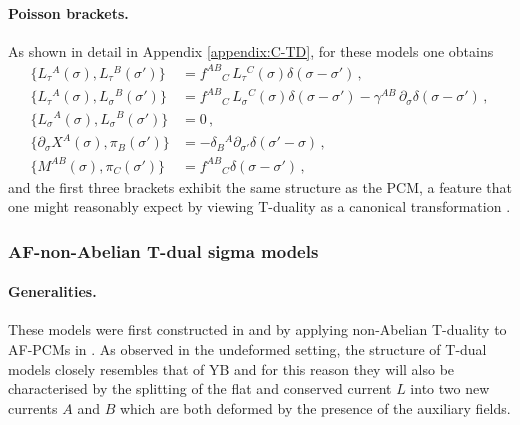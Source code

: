 \documentclass[12pt]{article}
\numberwithin{equation}{section}
\begin{document}
\paragraph{Poisson brackets.} As shown in detail in Appendix \ref{appendix:C-TD}, for these models one obtains
\begin{equation}\label{TD-brackets-summary}
\begin{aligned}
\{ L_{\tau}{}^{A}(\sigma),L_{\tau}{}^{B}(\sigma') \} &= f^{AB}{}_{C} \, L_{\tau}{}^{C}(\sigma)\delta(\sigma-\sigma') \, ,
\\
\{ L_{\tau}{}^{A}(\sigma),L_{\sigma}{}^{B}(\sigma') \} &= f^{AB}{}_{C} \, L_{\sigma}{}^{C}(\sigma)\delta(\sigma-\sigma')-\gamma^{AB} \, \partial_{\sigma}\delta(\sigma-\sigma') \, ,
\\
\{ L_{\sigma}{}^{A}(\sigma),L_{\sigma}{}^{B}(\sigma') \} &= 0 \, ,
\\
\{ \partial_{\sigma}X^{A}(\sigma),\pi_{B}(\sigma') \} &= -\delta_{B}{}^{A}\partial_{\sigma'}\delta(\sigma'-\sigma) \, ,
\\
\{ M^{AB}(\sigma),\pi_{C}(\sigma') \} &= f^{AB}{}_{C}\delta(\sigma-\sigma') \, ,
\end{aligned}
\end{equation}
and the first three brackets exhibit the same structure as the PCM, a feature that one might reasonably expect by viewing T-duality as a canonical transformation \cite{Alvarez:1994wj,Lozano:1995jx}.


\subsubsection{AF-non-Abelian T-dual sigma models}\label{subsubsec:AFTD}
\paragraph{Generalities.} These models were first constructed in \cite{Bielli:2024khq} and \cite{Bielli:2024ach} by applying non-Abelian T-duality to AF-PCMs in \cite{Ferko:2024ali}. As observed in the undeformed setting, the structure of T-dual models closely resembles that of YB and for this reason they will also be characterised by the splitting of the flat and conserved current $L$ into two new currents $A$ and $B$ which are both deformed by the presence of the auxiliary fields.
\end{document}
